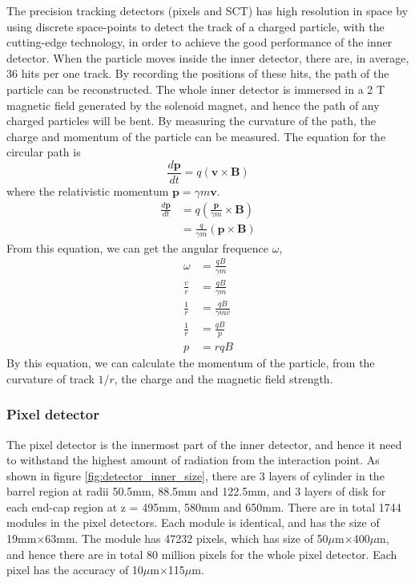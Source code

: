 The precision tracking detectors (pixels and SCT) has high resolution in space by using discrete space-points to detect the track of a charged particle, with the cutting-edge technology, in order to achieve the good performance of the inner detector.
When the particle moves inside the inner detector, there are, in average, 36 hits per one track.
By recording the positions of these hits, the path of the particle can be reconstructed.
The whole inner detector is immersed in a 2 T magnetic field generated by the solenoid magnet, and hence the path of any charged particles will be bent.
By measuring the curvature of the path, the charge and momentum of the particle can be measured.
The equation for the circular path is
\begin{equation}
\frac{d\mathbf{p}}{dt} = q(\mathbf{v} \times \mathbf{B})
\end{equation}
where the relativistic momentum $\mathbf{p} = \gamma m \mathbf{v}$.
\begin{align}
\frac{d\mathbf{p}}{dt} &= q( \frac{\mathbf{p}}{\gamma m} \times \mathbf{B}) \\
&= \frac{q}{\gamma m} (\mathbf{p} \times \mathbf{B})
\end{align}
From this equation, we can get the angular frequence $\omega$,
\begin{align}
\omega &= \frac{qB}{\gamma m} \\
\frac{v}{r} &= \frac{qB}{\gamma m} \\
\frac{1}{r} &= \frac{qB}{\gamma m v} \\
\frac{1}{r} &= \frac{qB}{p} \\
p &= rqB
\end{align}
By this equation, we can calculate the momentum of the particle, from the curvature of track $1/r$, the charge and the magnetic field strength.

\subsubsection{Pixel detector}
The pixel detector is the innermost part of the inner detector, and hence it need to withstand the highest amount of radiation from the interaction point.
As shown in figure \ref{fig:detector_inner_size}, there are 3 layers of cylinder in the barrel region at radii 50.5mm, 88.5mm and 122.5mm, and 3 layers of disk for each end-cap region at z = 495mm, 580mm and 650mm.
There are in total 1744 modules in the pixel detectors.
Each module is identical, and has the size of 19mm$\times$63mm.
The module has 47232 pixels, which has size of 50$\mu$m$\times$400$\mu$m, and hence there are in total 80 million pixels for the whole pixel detector.
Each pixel has the accuracy of 10$\mu$m$\times$115$\mu$m.


